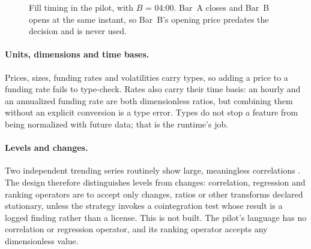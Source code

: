 \documentclass[11pt]{article}
\begin{document}
\begin{figure}[ht]
\centering
{}
\caption{Fill timing in the pilot, with $B$ = 04:00. Bar~A closes and Bar~B opens at the same instant, so Bar~B's opening price predates the decision and is never used.}
\label{fig:fill}
\end{figure}

\paragraph{Units, dimensions and time bases.} Prices, sizes, funding rates and volatilities carry types, so adding a price to a funding rate fails to type-check. Rates also carry their time basis: an hourly and an annualized funding rate are both dimensionless ratios, but combining them without an explicit conversion is a type error. Types do not stop a feature from being normalized with future data; that is the runtime's job.

\paragraph{Levels and changes.} Two independent trending series routinely show large, meaningless correlations \cite{granger1974}. The design therefore distinguishes levels from changes: correlation, regression and ranking operators are to accept only changes, ratios or other transforms declared stationary, unless the strategy invokes a cointegration test whose result is a logged finding rather than a license. This is not built. The pilot's language has no correlation or regression operator, and its ranking operator accepts any dimensionless value.
\end{document}
